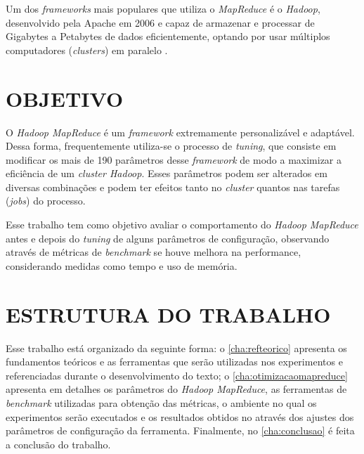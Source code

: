 Um dos \textit{\gls{framework}s} mais populares que utiliza o \textit{MapReduce} é o \textit{Hadoop}, desenvolvido pela Apache em 2006 e capaz de armazenar e processar de Gigabytes a Petabytes de dados eficientemente, optando por usar múltiplos computadores (\textit{clusters}) em paralelo \cite{HadoopBook15}.

\section{OBJETIVO} \label{sec:objetivo}

O \textit{Hadoop MapReduce} é um \textit{\gls{framework}} extremamente personalizável e adaptável. Dessa forma, frequentemente utiliza-se o processo de \textit{\gls{tuning}}, que consiste em modificar os mais de 190 parâmetros desse \textit{\gls{framework}} de modo a maximizar a eficiência de um \textit{cluster Hadoop}. Esses parâmetros podem ser alterados em diversas combinações e podem ter efeitos tanto no \textit{cluster} quantos nas tarefas (\textit{jobs}) do processo.

Esse trabalho tem como objetivo avaliar o comportamento do \textit{Hadoop MapReduce} antes e depois do \textit{tuning} de alguns parâmetros de configuração, observando através de métricas de \textit{\gls{benchmark}} se houve melhora na performance, considerando medidas como tempo e uso de memória.

\section{ESTRUTURA DO TRABALHO} \label{sec:estrtura}

Esse trabalho está organizado da seguinte forma: o \autoref{cha:refteorico} apresenta os fundamentos teóricos e as ferramentas que serão utilizadas nos experimentos e referenciadas durante o desenvolvimento do texto; o \autoref{cha:otimizacaomapreduce} apresenta em detalhes os parâmetros do \textit{Hadoop MapReduce}, as ferramentas de \textit{\gls{benchmark}} utilizadas para obtenção das métricas, o ambiente no qual os experimentos serão executados e os resultados obtidos no através dos ajustes dos parâmetros de configuração da ferramenta. Finalmente, no \autoref{cha:conclusao} é feita a conclusão do trabalho.